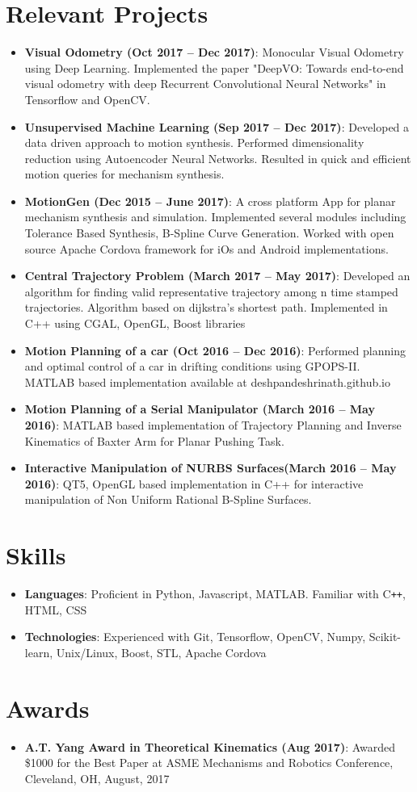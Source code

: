 \documentclass[letterpaper,11pt]{article}
\newcommand{\resumeItem}[2]{
  \item\small{
    \textbf{#1}{: #2 \vspace{-2pt}}
  }
}
\newcommand{\resumeSubItem}[2]{\resumeItem{#1}{#2}\vspace{-4pt}}
\newcommand{\resumeSubHeadingListStart}{\begin{itemize}[leftmargin=*]}
\newcommand{\resumeSubHeadingListEnd}{\end{itemize}}
\begin{document}
\section{Relevant Projects}
  \resumeSubHeadingListStart

    \resumeSubItem{Visual Odometry (Oct 2017 -- Dec 2017)}
      {Monocular Visual Odometry using Deep Learning. Implemented the paper "DeepVO: Towards end-to-end visual odometry with deep Recurrent Convolutional Neural Networks" in Tensorflow and OpenCV.}

    \resumeSubItem{Unsupervised Machine Learning (Sep 2017 -- Dec 2017)}
    {Developed a data driven approach to motion synthesis. Performed dimensionality reduction using Autoencoder Neural Networks. Resulted in quick and efficient motion queries for mechanism synthesis.}

    \resumeSubItem{MotionGen (Dec 2015 -- June 2017)}
    {A cross platform App for planar mechanism synthesis and simulation. Implemented several modules including Tolerance Based Synthesis, B-Spline Curve Generation. Worked with open source Apache Cordova framework for iOs and Android implementations.}

    \resumeSubItem{Central Trajectory Problem (March 2017 -- May 2017)}
    {Developed an algorithm for finding valid representative trajectory among n time stamped trajectories. Algorithm based on dijkstra's shortest path. Implemented in C++ using CGAL, OpenGL, Boost libraries}

    \resumeSubItem{Motion Planning of a car (Oct 2016 -- Dec 2016)}
    {Performed planning and optimal control of a car in drifting conditions using GPOPS-II. MATLAB based implementation available at deshpandeshrinath.github.io}

    \resumeSubItem{Motion Planning of a Serial Manipulator (March 2016 -- May 2016)}
    {MATLAB based implementation of Trajectory Planning and Inverse Kinematics of Baxter Arm for Planar Pushing Task.}

    \resumeSubItem{Interactive Manipulation of NURBS Surfaces(March 2016 -- May 2016)}
    {QT5, OpenGL based implementation in C++ for interactive manipulation of Non Uniform Rational B-Spline Surfaces.}
  \resumeSubHeadingListEnd

\section{Skills}
  \resumeSubHeadingListStart
    \resumeSubItem{Languages}{Proficient in Python, Javascript, MATLAB. Familiar with C\texttt{++}, HTML, CSS}
    \resumeSubItem{Technologies}{Experienced with Git, Tensorflow, OpenCV, Numpy, Scikit-learn, Unix/Linux, Boost, STL, Apache Cordova}
  \resumeSubHeadingListEnd

\section{Awards}
  \resumeSubHeadingListStart
    \resumeSubItem{A.T. Yang Award in Theoretical Kinematics (Aug 2017)}
    {Awarded \$1000 for the Best Paper at ASME Mechanisms and Robotics Conference, Cleveland, OH, August, 2017}
  \resumeSubHeadingListEnd
\end{document}
